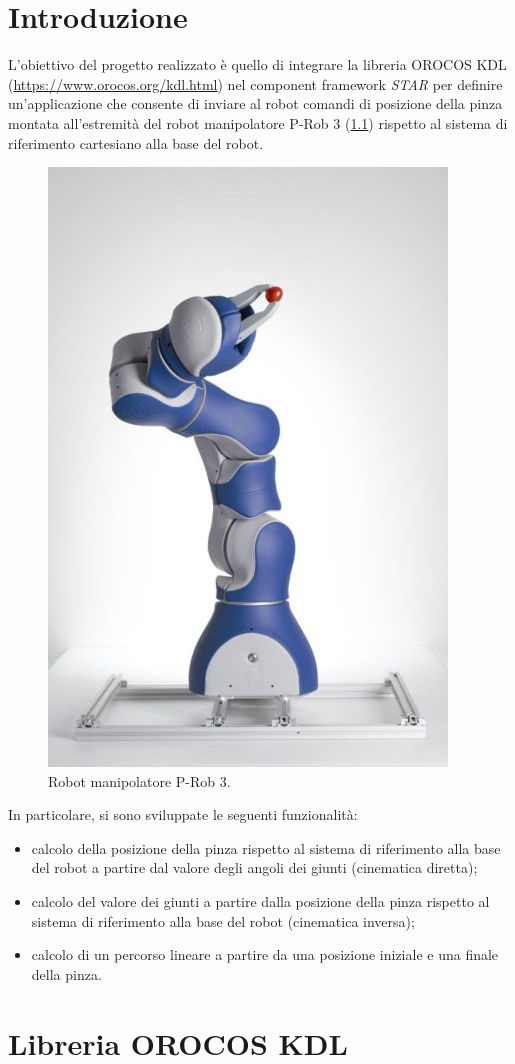 
\chapter{Introduzione}
L'obiettivo del progetto realizzato è quello di integrare la libreria OROCOS KDL (\url{https://www.orocos.org/kdl.html}) nel component framework \textit{STAR} per definire un'applicazione che consente di inviare al robot comandi di posizione della pinza montata all'estremità del robot manipolatore P-Rob 3 (\Fig\ref{fig:prob3}) rispetto al sistema di riferimento cartesiano alla base del robot.
\begin{figure}[b!]
	\centering
	\includegraphics[width=0.4\linewidth]{./ImageFiles/P-Rob 3.jpg}
	\caption{Robot manipolatore P-Rob 3.}
	\label{fig:prob3}
\end{figure}
In particolare, si sono sviluppate le seguenti funzionalità:
\begin{itemize}
	\item calcolo della posizione della pinza rispetto al sistema di riferimento alla base del robot a partire dal valore degli angoli dei giunti (cinematica diretta);
	\item calcolo del valore dei giunti a partire dalla posizione della pinza rispetto al sistema di riferimento alla base del robot (cinematica inversa);
	\item calcolo di un percorso lineare a partire da una posizione iniziale e una finale della pinza.
\end{itemize}

\chapter{Libreria OROCOS KDL}
